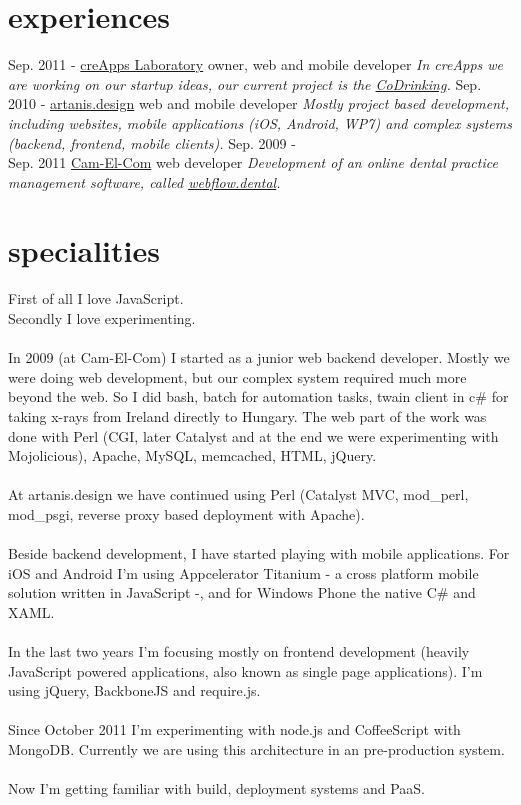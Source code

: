 \documentclass[]{friggeri-cv}
\begin{document}
\section{experiences}

\begin{entrylist}
	\entry
		{Sep. 2011 - }
		{\href{http://creapps.net}{creApps Laboratory}}
		{owner, web and mobile developer}
		{\emph{In creApps we are working on our startup ideas, our current project is the \href{http://codrinking.net}{CoDrinking}.}}
	\entry
		{Sep. 2010 - }
		{\href{http://artanisdesign.eu/}{artanis.design}}
		{web and mobile developer}
		{\emph{Mostly project based development, including websites, mobile applications (iOS, Android, WP7) and complex systems (backend, frontend, mobile clients).}}
	\entry
		{Sep. 2009 -\\ Sep. 2011}
		{\href{http://camelcom.hu}{Cam-El-Com}}
		{web developer}
		{\emph{Development of an online dental practice management software, called \href{http://webflow-dental.com/}{webflow.dental}.}}
\end{entrylist}

\section{specialities}
First of all I love JavaScript.\\
Secondly I love experimenting.\\
\\
In 2009 (at Cam-El-Com) I started as a junior web backend developer. Mostly we were doing web development, but our complex system required much more beyond the web. So I did bash, batch for automation tasks, twain client in c\# for taking x-rays from Ireland directly to Hungary. The web part of the work was done with Perl (CGI, later Catalyst and at the end we were experimenting with Mojolicious), Apache, MySQL, memcached, HTML, jQuery.\\
\\
At artanis.design we have continued using Perl (Catalyst MVC, mod\_perl, mod\_psgi, reverse proxy based deployment with Apache).\\
\\
Beside backend development, I have started playing with mobile applications. For iOS and Android I'm using Appcelerator Titanium - a cross platform mobile solution written in JavaScript -, and for Windows Phone the native C\# and XAML.\\
\\
In the last two years I'm focusing mostly on frontend development (heavily JavaScript powered applications, also known as single page applications). I'm using jQuery, BackboneJS and require.js.\\
\\
Since October 2011 I'm experimenting with node.js and CoffeeScript with MongoDB. Currently we are using this architecture in an pre-production system.\\
\\
Now I'm getting familiar with build, deployment systems and PaaS.\\
\end{document}
